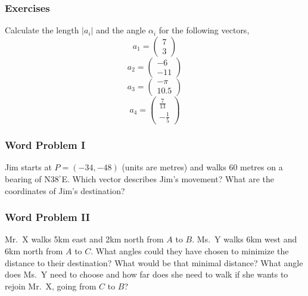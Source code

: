 \documentclass[xcolor=dvipsnames]{beamer}
\begin{document}
\begin{frame}
  \frametitle{Exercises}
Calculate the length $|a_{i}|$ and the angle $\alpha_{i}$ for the following
vectors,
\begin{equation}
  \label{eq:aozurohp}
  a_{1}=\left(
    \begin{array}{c}
      7 \\
      3
    \end{array}\right)
\end{equation}
\begin{equation}
  \label{eq:atheimah}
  a_{2}=\left(
    \begin{array}{c}
      -6 \\
      -11
    \end{array}\right)
\end{equation}
\begin{equation}
  \label{eq:chefoobo}
  a_{3}=\left(
    \begin{array}{c}
      -\pi \\
      10.5
    \end{array}\right)
\end{equation}
\begin{equation}
  \label{eq:aevebuaf}
  a_{4}=\left(
    \begin{array}{c}
      \frac{7}{13} \\
      -\frac{1}{5}
    \end{array}\right)
\end{equation}
\end{frame}

\begin{frame}
  \frametitle{Word Problem I}
  Jim starts at $P=(-34,-48)$ (units are metres) and walks 60 metres
  on a bearing of N$38^{\circ}$E. Which vector describes Jim's
  movement? What are the coordinates of Jim's destination?
\end{frame}

\begin{frame}
  \frametitle{Word Problem II}
  Mr.\ X walks 5km east and 2km north from $A$ to $B$. Ms.\ Y walks
  6km west and 6km north from $A$ to $C$. What angles could they have
  chosen to minimize the distance to their destination? What would be
  that minimal distance? What angle does Ms.\ Y need to choose and how
  far does she need to walk if she wants to rejoin Mr.\ X, going from
  $C$ to $B$?
\end{frame}
\end{document}
